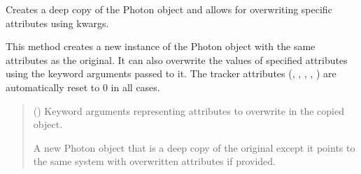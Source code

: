 \documentclass[letterpaper,10pt,english]{sphinxmanual}
\begin{document}
\begin{fulllineitems}
\begin{fulllineitems}
\begin{quote}
\begin{description}
\end{description}\end{quote}

\end{fulllineitems}


\begin{fulllineitems}
\label{\detokenize{generated/photon_canon.optics:photon_canon.optics.Photon.copy}}
\pysigstartsignatures
\pysiglinewithargsret
{}
{}
{}
\pysigstopsignatures
\sphinxAtStartPar
Creates a deep copy of the Photon object and allows for overwriting specific attributes using kwargs.

\sphinxAtStartPar
This method creates a new instance of the Photon object with the same attributes as the original. It can also
overwrite the values of specified attributes using the keyword arguments passed to it. The tracker attributes
(, , , , ) are automatically reset to 0 in all cases.
\begin{quote}\begin{description}
\sphinxAtStartPar
{} () \textendash{} Keyword arguments representing attributes to overwrite in the copied object.

\sphinxAtStartPar
A new Photon object that is a deep copy of the original \textendash{} except it points to the same system \textendash{} with
overwritten attributes if provided.

\sphinxAtStartPar
{\hyperref[\detokenize{generated/photon_canon.optics:photon_canon.optics.Photon}]{}}

\end{description}\end{quote}

\end{fulllineitems}



\end{fulllineitems}
\end{document}
